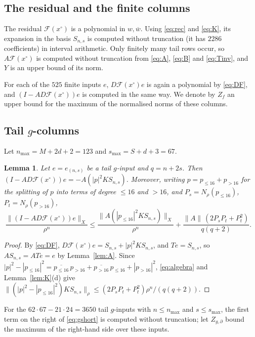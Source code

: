 \documentclass[11pt]{amsart}
\newtheorem{lemma}[theorem]{Lemma}
\theoremstyle{definition}
\theoremstyle{remark}
\numberwithin{equation}{section}
\newcommand{\Fc}{\mathcal{F}}
\newcommand{\bw}{\overline{w}}
\newcommand{\nrm}[1]{\lVert #1\rVert}
\begin{document}
\subsection{The residual and the finite columns}\label{subsec:finite}
The residual $\Fc(x^\circ)$ is a polynomial in $w,\bw$. Using \eqref{eq:rec} and \eqref{eq:K}, its expansion in the basis $S_{n,s}$ is computed without truncation (it has $2286$ coefficients) in interval arithmetic. Only finitely many tail rows occur, so $A\Fc(x^\circ)$ is computed without truncation from \eqref{eq:A}, \eqref{eq:B} and \eqref{eq:Tinv}, and $Y$ is an upper bound of its norm.

For each of the $525$ finite inputs $e$, $D\Fc(x^\circ)e$ is again a polynomial by \eqref{eq:DF}, and $(I-AD\Fc(x^\circ))e$ is computed in the same way. We denote by $Z_f$ an upper bound for the maximum of the normalised norms of these columns.

\subsection{\texorpdfstring{Tail $g$-columns}{Tail g-columns}}
Let $n_{\max}=M+2d+2=123$ and $s_{\max}=S+d+3=67$.

\begin{lemma}\label{lem:gtail}
Let $e=e_{(n,s)}$ be a tail $g$-input and $q=n+2s$. Then $(I-AD\Fc(x^\circ))e=-A(|p|^2KS_{n,s})$. Moreover, writing $p=p_{\leq16}+p_{>16}$ for the splitting of $p$ into terms of degree $\leq16$ and $>16$, and $P_s=N_\rho(p_{\leq16})$, $P_t=N_\rho(p_{>16})$,
\begin{equation}\label{eq:gshort}
\frac{\nrm{(I-AD\Fc(x^\circ))e}_X}{\rho^n}\leq\frac{\nrm{A(|p_{\leq16}|^2KS_{n,s})}_X}{\rho^n}+\frac{\nrm A\,(2P_sP_t+P_t^2)}{q(q+2)} .
\end{equation}
\end{lemma}

\begin{proof}
By \eqref{eq:DF}, $D\Fc(x^\circ)e=S_{n,s}+|p|^2KS_{n,s}$, and $Te=S_{n,s}$, so $AS_{n,s}=ATe=e$ by Lemma~\ref{lem:A}. Since $|p|^2-|p_{\leq16}|^2=\overline{p_{\leq16}}\,p_{>16}+\overline{p_{>16}}\,p_{\leq16}+|p_{>16}|^2$, \eqref{eq:algebra} and Lemma~\ref{lem:K}(d) give $\nrm{(|p|^2-|p_{\leq16}|^2)KS_{n,s}}_\rho\leq(2P_sP_t+P_t^2)\rho^n/(q(q+2))$.
\end{proof}

For the $62\cdot67-21\cdot24=3650$ tail $g$-inputs with $n\leq n_{\max}$ and $s\leq s_{\max}$, the first term on the right of \eqref{eq:gshort} is computed without truncation; let $Z_{g,\partial}$ bound the maximum of the right-hand side over these inputs.
\end{document}

